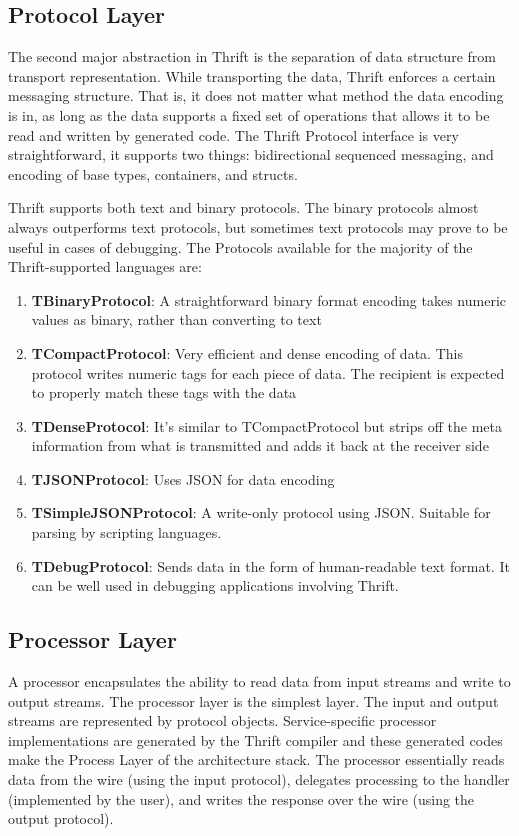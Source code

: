 \documentclass[9pt,twocolumn,twoside]{../../styles/osajnl}
\begin{document}

\subsection{Protocol Layer}
The second major abstraction in Thrift is the separation of data structure from transport representation. While transporting the data, Thrift enforces a certain messaging structure. That is, it does not matter what method the data encoding is in, as long as the data supports a fixed set of operations that allows it to be read and written by generated code. The Thrift Protocol interface is very straightforward, it supports two things: bidirectional sequenced messaging, and encoding of base types, containers, and structs.

Thrift supports both text and binary protocols. The binary protocols almost always outperforms text protocols, but sometimes text protocols may prove to be useful in cases of debugging. The Protocols available for the majority of the Thrift-supported languages are:
\begin{enumerate}
	\item \textbf{TBinaryProtocol}: A straightforward binary format encoding takes numeric values as binary, rather than converting to text
	\item \textbf{TCompactProtocol}: Very efficient and dense encoding of data. This protocol writes numeric tags for each piece of data. The recipient is expected to properly match these tags with the data
	\item \textbf{TDenseProtocol}: It’s similar to TCompactProtocol but strips off the meta information from what is transmitted and adds it back at the receiver side
	\item \textbf{TJSONProtocol}: Uses JSON for data encoding
	\item \textbf{TSimpleJSONProtocol}: A write-only protocol using JSON. Suitable for parsing by scripting languages.
	\item \textbf{TDebugProtocol}: Sends data in the form of human-readable text format. It can be well used in debugging applications involving Thrift.
\end{enumerate}


\subsection{Processor Layer}
A processor encapsulates the ability to read data from input streams and write to output streams. The processor layer is the simplest layer. The input and output streams are represented by protocol objects. Service-specific processor implementations are generated by the Thrift compiler and these generated codes make the Process Layer of the architecture stack. The processor essentially reads data from the wire (using the input protocol), delegates processing to the handler (implemented by the user), and writes the response over the wire (using the output protocol).
\end{document}
